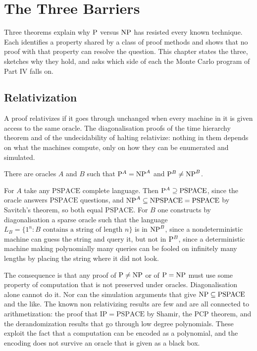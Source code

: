\chapter{The Three Barriers}
\label{ch:barriers}

Three theorems explain why $\mathrm{P}$ versus $\mathrm{NP}$ has resisted every known technique. Each identifies a property shared by a class of proof methods and shows that no proof with that property can resolve the question. This chapter states the three, sketches why they hold, and asks which side of each the Monte Carlo program of Part IV falls on.

\section{Relativization}

A proof relativizes if it goes through unchanged when every machine in it is given access to the same oracle. The diagonalisation proofs of the time hierarchy theorem and of the undecidability of halting relativize: nothing in them depends on what the machines compute, only on how they can be enumerated and simulated.

\begin{theorem}
There are oracles $A$ and $B$ such that $\mathrm{P}^A = \mathrm{NP}^A$ and $\mathrm{P}^B \neq \mathrm{NP}^B$.
\end{theorem}

For $A$ take any $\mathrm{PSPACE}$ complete language. Then $\mathrm{P}^A \supseteq \mathrm{PSPACE}$, since the oracle answers $\mathrm{PSPACE}$ questions, and $\mathrm{NP}^A \subseteq \mathrm{NPSPACE} = \mathrm{PSPACE}$ by Savitch's theorem, so both equal $\mathrm{PSPACE}$. For $B$ one constructs by diagonalisation a sparse oracle such that the language $L_B = \{ 1^n : B \text{ contains a string of length } n \}$ is in $\mathrm{NP}^B$, since a nondeterministic machine can guess the string and query it, but not in $\mathrm{P}^B$, since a deterministic machine making polynomially many queries can be fooled on infinitely many lengths by placing the string where it did not look.

The consequence is that any proof of $\mathrm{P} \neq \mathrm{NP}$ or of $\mathrm{P} = \mathrm{NP}$ must use some property of computation that is not preserved under oracles. Diagonalisation alone cannot do it. Nor can the simulation arguments that give $\mathrm{NP} \subseteq \mathrm{PSPACE}$ and the like. The known non relativizing results are few and are all connected to arithmetization: the proof that $\mathrm{IP} = \mathrm{PSPACE}$ by Shamir, the PCP theorem, and the derandomization results that go through low degree polynomials. These exploit the fact that a computation can be encoded as a polynomial, and the encoding does not survive an oracle that is given as a black box.

